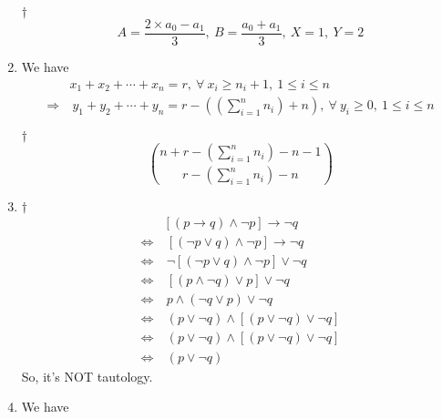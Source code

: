 \documentclass[a4paper,12pt]{article}
\begin{document}
\begin{enumerate}
    \begin{answer}{$\dag$}\begin{equation}
            A = \frac{2 \times a_0 - a_1}{3}, \ B = \frac{a_0 + a_1}{3}, \ X = 1, \ Y = 2
        \end{equation}
    \end{answer} 
    \item We have \begin{equation}
        \begin{aligned}
            & x_1 + x_2 + \cdots + x_n = r, \ \forall \ x_i \ge n_i + 1, \ 1 \le i \le n \\
            \Rightarrow & \ y_1 + y_2 + \cdots + y_n = r - ((\sum_{i = 1}^n n_i) + n), \ \forall \ y_i \ge 0, \ 1 \le i \le n
        \end{aligned}
    \end{equation}
    \begin{answer}{$\dag$}\begin{equation}
            \binom{n + r - (\sum_{i = 1}^{n}n_i) - n - 1}{r - (\sum_{i = 1}^{n}n_i) - n}
        \end{equation}
    \end{answer}
    \item \begin{answer}{$\dag$}\begin{equation}
            \begin{aligned}
                & [(p \rightarrow q) \land \neg p] \rightarrow \neg q \\
                \iff & \ [(\neg p \lor q) \land \neg p] \rightarrow \neg q \\
                \iff & \ \neg [(\neg p \lor q) \land \neg p] \lor \neg q \\
                \iff & \ [(p \land \neg q) \lor p] \lor \neg q \\
                \iff & \ p \land (\neg q \lor p) \lor \neg q \\
                \iff & \ (p \lor \neg q) \land [(p \lor \neg q) \lor \neg q] \\
                \iff & \ (p \lor \neg q) \land [(p \lor \neg q) \lor \neg q] \\
                \iff & \ (p \lor \neg q) 
            \end{aligned}
        \end{equation} So, it's NOT tautology.
    \end{answer}
    \item We have \begin{itemize}

\end{itemize}
\end{enumerate}
\end{document}
